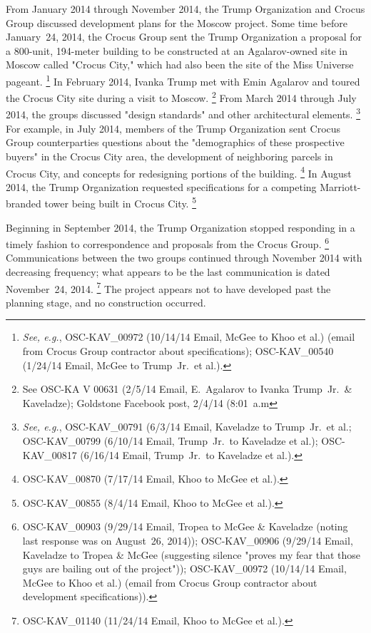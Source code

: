 From January 2014 through November 2014, the Trump Organization and Crocus Group discussed development plans for the Moscow project.
Some time before January~24, 2014, the Crocus Group sent the Trump Organization a proposal for a 800-unit, 194-meter building to be constructed at an Agalarov-owned site in Moscow called "Crocus City," which had also been the site of the Miss Universe pageant.%
\footnote{\textit{See, e.g.}, OSC-KAV\_00972 (10/14/14 Email, McGee to Khoo et al.) (email from Crocus Group contractor about specifications); OSC-KAV\_00540 (1/24/14 Email, McGee to Trump~Jr.\ et al.).}
In February 2014, Ivanka Trump met with Emin Agalarov and toured the Crocus City site during a visit to Moscow.%
\footnote{See OSC-KA V 00631 (2/5/14 Email, E.~Agalarov to Ivanka Trump~Jr.\ \& Kaveladze); Goldstone Facebook post, 2/4/14 (8:01~a.m} 
From March 2014 through July 2014, the groups discussed "design standards" and other architectural elements.%
\footnote{\textit{See, e.g.}, OSC-KAV\_00791 (6/3/14 Email, Kaveladze to Trump~Jr.\ et al.; OSC-KAV\_00799 (6/10/14 Email, Trump~Jr.\ to Kaveladze et al.); OSC-KAV\_00817 (6/16/14 Email, Trump~Jr.\ to Kaveladze et al.).}
For example, in July 2014, members of the Trump Organization sent Crocus Group counterparties questions about the "demographics of these prospective buyers" in the Crocus City area, the development of neighboring parcels in Crocus City, and concepts for redesigning portions of the building.%
\footnote{OSC-KAV\_00870 (7/17/14 Email, Khoo to McGee et al.).}
In August 2014, the Trump Organization requested specifications for a competing Marriott-branded tower being built in Crocus City.%
\footnote{OSC-KAV\_00855 (8/4/14 Email, Khoo to McGee et al.).}

Beginning in September 2014, the Trump Organization stopped responding in a timely fashion to correspondence and proposals from the Crocus Group.%
\footnote{OSC-KAV\_00903 (9/29/14 Email, Tropea to McGee \& Kaveladze (noting last response was on August~26, 2014)); OSC-KAV\_00906 (9/29/14 Email, Kaveladze to Tropea \& McGee (suggesting silence "proves my fear that those guys are bailing out of the project")); OSC-KAV\_00972 (10/14/14 Email, McGee to Khoo et al.) (email from Crocus Group contractor about development specifications)).}
Communications between the two groups continued through November 2014 with decreasing frequency; what appears to be the last communication is dated November~24, 2014.%
\footnote{OSC-KAV\_01140 (11/24/14 Email, Khoo to McGee et al.).}
The project appears not to have developed past the planning stage, and no construction occurred.

